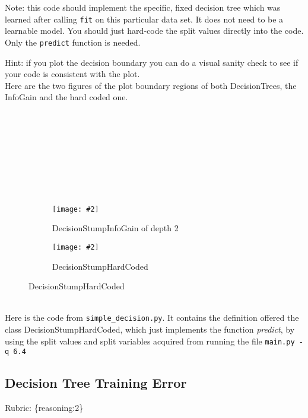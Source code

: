 \documentclass{article}
\def\rubric#1{\gre{Rubric: \{#1\}}}{}
\def\gre#1{{\color{gre}#1}}
\def\ans#1{{\color{ans}#1}}
\newcommand{\centerfig}[2]{\begin{center}\texttt{[image: \#2]}\end{center}}
\begin{document}
Note: this code should implement the specific, fixed decision tree
which was learned after calling \texttt{fit} on this particular data set. It does not need to be a learnable model.
You should just hard-code the split values directly into the code. Only the \texttt{predict} function is needed.

Hint: if you plot the decision boundary you can do a visual sanity check to see if your code is consistent with the plot. \\


\ans{
    Here are the two figures of the plot boundary regions of both DecisionTrees, the InfoGain and the hard coded one. \\ \\ \\ \\ \\ \\ \\ \\ \\
}
\begin{figure}[htp]
    \begin{subfigure}[b]{0.4\textwidth}
        \centerfig{1}{../figs/q6_4_decisionBoundary}
      \caption{DecisionStumpInfoGain of depth 2}
      \label{fig:1}
    \end{subfigure}
    \begin{subfigure}[b]{0.4\textwidth}
        \centerfig{1}{../figs/q6_4_1_HardCodedDecisionBoundary}
        \caption{DecisionStumpHardCoded}
      \label{fig:2}
    \end{subfigure}
\end{figure}
\ans{
     \\Here is the code from \texttt{simple\string_decision.py}. It contains the definition offered
     the class DecisionStumpHardCoded, which just implements the function \emph{predict}, by
     using the split values and split variables acquired from running the file \texttt{main.py -q 6.4} \\
}
\begin{center}
    
\end{center}

\subsection{Decision Tree Training Error}
\rubric{reasoning:2}
\end{document}

